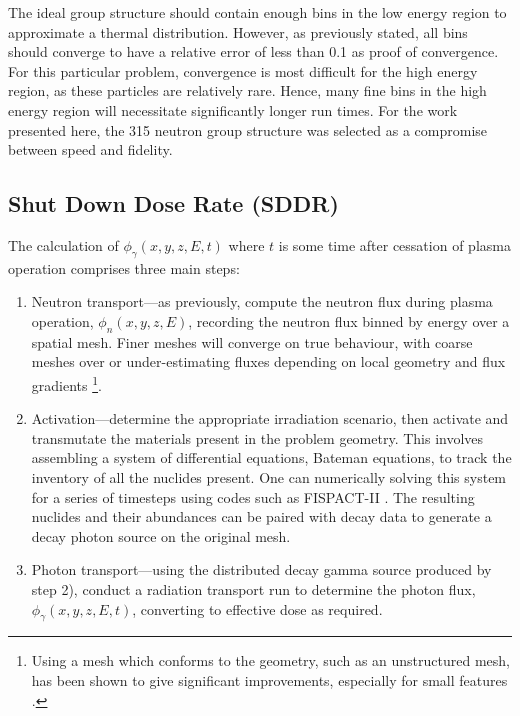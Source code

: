 The ideal group structure should contain enough bins in the low energy region to approximate a thermal distribution. However, as previously stated, all bins should converge to have a relative error of less than 0.1 as proof of convergence. For this particular problem, convergence is most difficult for the high energy region, as these particles are relatively rare. Hence, many fine bins in the high energy region will necessitate significantly longer run times. For the work presented here, the 315 neutron group structure was selected as a compromise between speed and fidelity.


\subsection{Shut Down Dose Rate (SDDR)}
The calculation of $\phi_{\gamma}(x,y,z,E,t)$ where $t$ is some time after cessation of plasma operation comprises three main steps:
\begin{enumerate}
  \item Neutron transport---as previously, compute the neutron flux during plasma operation, $\phi_{n}(x,y,z,E)$, recording the neutron flux binned by energy over a spatial mesh. Finer meshes will converge on true behaviour, with coarse meshes over or under-estimating fluxes depending on local geometry and flux gradients \footnote{Using a mesh which conforms to the geometry, such as an unstructured mesh, has been shown to give significant improvements, especially for small features \cite{Eade2015}.}.
  \item Activation---determine the appropriate irradiation scenario, then activate and transmutate the materials present in the problem geometry. This involves assembling a system of differential equations, Bateman equations, to track the inventory of all the nuclides present. One can numerically solving this system for a series of timesteps using codes such as FISPACT-II \cite{sublet2017a}. The resulting nuclides and their abundances can be paired with decay data to generate a decay photon source on the original mesh. 
  \item Photon transport---using the distributed decay gamma source produced by step 2), conduct a radiation transport run to determine the photon flux, $\phi_{\gamma}(x,y,z,E,t)$, converting to effective dose as required.
\end{enumerate}

